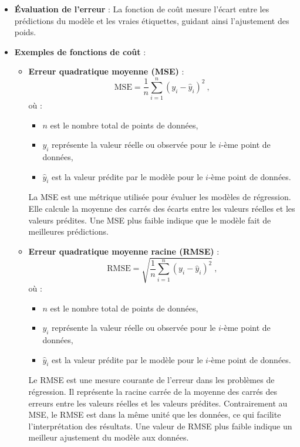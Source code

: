 \begin{itemize}
	\item \textbf{Évaluation de l'erreur} : La fonction de coût mesure l'écart entre les prédictions du modèle et les vraies étiquettes, guidant ainsi l'ajustement des poids.
	\item \textbf{Exemples de fonctions de coût} :
	\begin{itemize}
		\item \textbf{Erreur quadratique moyenne (MSE)} : 
		\[
		\text{MSE} = \frac{1}{n} \sum_{i=1}^{n} (y_i - \hat{y}_i)^2~,
		\]
		où :
		\begin{itemize}
			\item $n$ est le nombre total de points de données,
			\item $y_i$ représente la valeur réelle ou observée pour le $i$-ème point de données,
			\item $\hat{y}_i$ est la valeur prédite par le modèle pour le $i$-ème point de données.
		\end{itemize}
		
		La MSE est une métrique utilisée pour évaluer les modèles de régression. Elle calcule la moyenne des carrés des écarts entre les valeurs réelles et les valeurs prédites. Une MSE plus faible indique que le modèle fait de meilleures prédictions.
		\item \textbf{Erreur quadratique moyenne racine (RMSE)} : 
		\[
		\text{RMSE} = \sqrt{\frac{1}{n} \sum_{i=1}^{n} (y_i - \hat{y}_i)^2}~,
		\]
		où :
		\begin{itemize}
			\item $n$ est le nombre total de points de données,
			\item $y_i$ représente la valeur réelle ou observée pour le $i$-ème point de données,
			\item $\hat{y}_i$ est la valeur prédite par le modèle pour le $i$-ème point de données.
		\end{itemize}
		
		 Le RMSE est une mesure courante de l'erreur dans les problèmes de régression. Il représente la racine carrée de la moyenne des carrés des erreurs entre les valeurs réelles et les valeurs prédites. Contrairement au MSE, le RMSE est dans la même unité que les données, ce qui facilite l'interprétation des résultats. Une valeur de RMSE plus faible indique un meilleur ajustement du modèle aux données.
	

\end{itemize}
\end{itemize}
